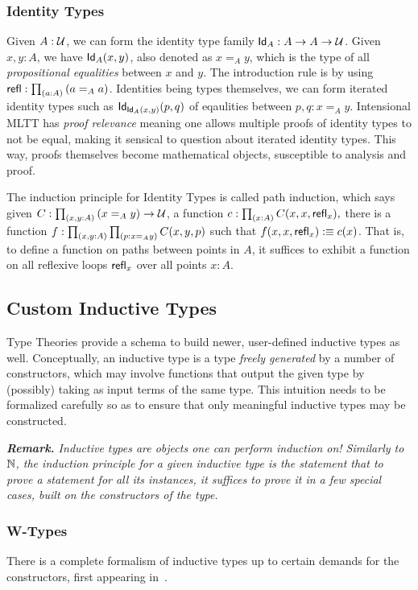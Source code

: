 \subsubsection{Identity Types}
Given $A : \mathcal{U}$, we can form the identity type family $\mathsf{Id}_A : A \to A \to \mathcal{U}$. Given $x, y: A$, we have $\mathsf{Id}_A(x,y)$, also denoted as
$x =_A y$, which is the type of all \textit{propositional equalities} between $x$ and $y$. The introduction rule is by using
$\mathsf{refl} : \prod_{(a:A)}{(}a =_A a)$.
Identities being types themselves, we can form iterated identity types such as $\mathsf{Id}_{\mathsf{Id}_A(x,y)}(p,q)$ of eqaulities between
$p, q : x =_A y$. Intensional MLTT has \emph{proof relevance} meaning one allows multiple proofs of identity types to not be equal,
making it sensical to question about iterated identity types.
This way, proofs themselves become mathematical objects, susceptible to analysis and proof.

The induction principle for Identity Types is called path induction, which says 
given $C : \prod_{(x, y : A)}{(}x =_A y) \to \mathcal{U}$, a function $c : \prod_{(x : A)}{C(x,x,\mathsf{refl}_x)},$
there is a function $f : \prod_{(x,y : A)}{\prod_{(p: x =_A y)}{C}(x,y,p)}$ such that $f(x,x,\mathsf{refl}_x) :\equiv c(x)$.
That is, to define a function on paths between points in $A$, it suffices to exhibit a function on all
reflexive loops $\mathsf{refl}_x$ over all points $x : A$.

\subsection{Custom Inductive Types}
Type Theories provide a schema to build newer, user-defined inductive types as well.
Conceptually, an inductive type is a type \textit{freely generated} by a number of constructors, which may involve functions
that output the given type by (possibly) taking as input terms of the same type. This intuition needs
to be formalized carefully so as to ensure that only meaningful inductive types may be constructed.

\textit{\textbf{Remark.} Inductive types are objects one can perform induction on! 
Similarly to $\mathbb{N}$, the \textit{induction principle} for a given inductive type is the statement that to prove a
statement for all its instances, it suffices to prove it in a few special cases, built on the constructors
of the type.}

\subsubsection{W-Types}
There is a complete formalism of inductive types up to certain demands for the constructors, first appearing in~\cite{martin1982constructive}.

